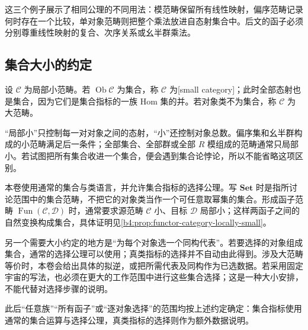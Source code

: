 这三个例子展示了相同公理的不同用法：模范畴保留所有线性映射，偏序范畴记录何时存在一个比较，单对象范畴则把整个乘法放进自态射集合中。后文的函子必须分别尊重线性映射的复合、次序关系或幺半群乘法。

\subsection{集合大小的约定}
\label{b4:subsec:0101:03}

\begin{definition}\label{b4:def:small-category}
	设 \(\mathcal C\) 为局部小范畴。若 \(\operatorname{Ob}\mathcal C\) 为集合，称 \(\mathcal C\) 为[small category]；此时全部态射也是集合，因为它们是集合指标的一族 Hom 集的并。若对象类不为集合，称 \(\mathcal C\) 为大范畴。
\end{definition}

“局部小”只控制每一对对象之间的态射，“小”还控制对象总数。偏序集和幺半群构成的小范畴满足后一条件；全部集合、全部群或全部 \(R\) 模组成的范畴通常只局部小。若试图把所有集合收进一个集合，便会遇到集合论悖论，所以不能省略这项区别。

\ProseParagraphBreak
本卷使用通常的集合与类语言，并允许集合指标的选择公理。写 \(\mathbf{Set}\) 时是指所讨论范围中的集合范畴，不把它的对象类当作一个可任意取幂集的集合。形成函子范畴 \(\operatorname{Fun}(\mathcal C,\mathcal D)\) 时，通常要求源范畴 \(\mathcal C\) 小、目标 \(\mathcal D\) 局部小；这样两函子之间的自然变换构成集合，具体证明见\cref{b4:prop:functor-category-locally-small}。

\ProseParagraphBreak
另一个需要大小约定的地方是“为每个对象选一个同构代表”。若要选择的对象组成集合，通常的选择公理可以使用；真类指标的选择并不自动由此得到。涉及大范畴等价时，本卷会给出具体的拟逆，或把所需代表及同构作为已选数据。若采用固定宇宙的写法，也必须在更大的工作范围中进行这些集合选择；这是一种大小安排，不能代替对选择步骤的说明。

\ProseParagraphBreak
此后“任意族”“所有函子”或“逐对象选择”的范围均按上述约定确定：集合指标使用通常的集合运算与选择公理，真类指标的选择则作为额外数据说明。
